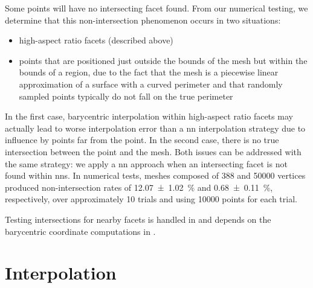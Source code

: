 \documentclass[final,12pt]{elsarticle}
\begin{document}
Some \outpt{} points will have no intersecting facet found.
From our numerical testing, we determine that this non-intersection phenomenon occurs in two situations:
\begin{itemize}%
	\item high-aspect ratio facets (described above)
	\item \outpt{} points that are positioned just outside the bounds of the mesh but within the bounds of a region, due to the fact that the mesh is a piecewise linear approximation of a surface with a curved perimeter and that randomly sampled points typically do not fall on the true perimeter
\end{itemize}
In the first case, barycentric interpolation within high-aspect ratio facets may actually lead to worse interpolation error than a \gls{nn} interpolation strategy due to influence by points far from the \outpt{} point. In the second case, there is no true intersection between the \outpt{} point and the mesh. Both issues can be addressed with the same strategy: we apply a \gls{nn} approach when an intersecting facet is not found within  \glspl{nn}. In numerical tests, meshes composed of \num{388} and \num{50000} vertices produced non-intersection rates of \SI{12.07 \pm 1.02}{\percent} and \SI{0.68 \pm 0.11}{\percent}, respectively, over approximately \num{10} trials and using \num{10000} \outpt{} points for each trial.

Testing intersections for nearby facets is handled in  and depends on the barycentric coordinate computations in .

\section{Interpolation}
\label{sec:app:bary-interp}
\end{document}
